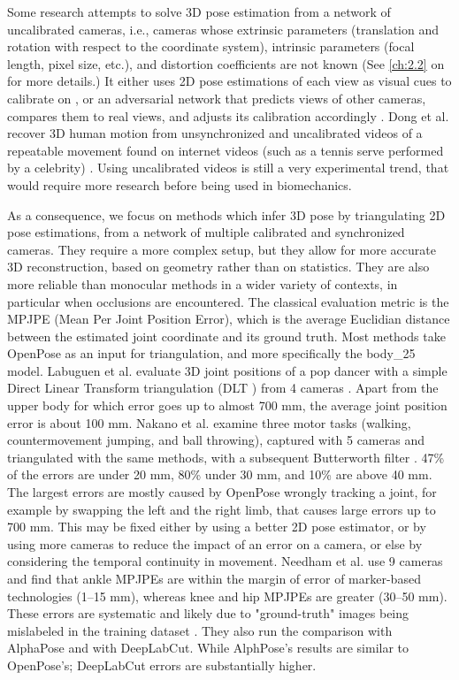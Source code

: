 \newpage
Some research attempts to solve 3D pose estimation from a network of uncalibrated cameras, i.e., cameras whose extrinsic parameters (translation and rotation with respect to the coordinate system), intrinsic parameters (focal length, pixel size, etc.), and distortion coefficients are not known (See \autoref{ch:2.2} on  for more details.) It either uses 2D pose estimations of each view as visual cues to calibrate on \cite{Takahashi2018, Xu2021, Liu2022a}, or an adversarial network that predicts views of other cameras, compares them to real views, and adjusts its calibration accordingly \cite{Ershadi-Nasab2021}. Dong et al. recover 3D human motion from unsynchronized and uncalibrated videos of a repeatable movement found on internet videos (such as a tennis serve performed by a celebrity) \cite{Dong2020}. Using uncalibrated videos is still a very experimental trend, that would require more research before being used in biomechanics. 

As a consequence, we focus on methods which infer 3D pose by triangulating 2D pose estimations, from a network of multiple calibrated and synchronized cameras. They require a more complex setup, but they allow for more accurate 3D reconstruction, based on geometry rather than on statistics. They are also more reliable than monocular methods in a wider variety of contexts, in particular when occlusions are encountered. The classical evaluation metric is the MPJPE (Mean Per Joint Position Error), which is the average Euclidian distance between the estimated joint coordinate and its ground truth. Most methods take OpenPose as an input for triangulation, and more specifically the body\_25 model. Labuguen et al. evaluate 3D joint positions of a pop dancer with a simple Direct Linear Transform triangulation (DLT \cite{Hartley1997,Miller1980}) from 4 cameras \cite{Labuguen2020}. Apart from the upper body for which error goes up to almost 700 mm, the average joint position error is about 100 mm. Nakano et al. examine three motor tasks (walking, countermovement jumping, and ball throwing), captured with 5 cameras and triangulated with the same methods, with a subsequent Butterworth filter \cite{Nakano2019}. 47\% of the errors are under 20 mm, 80\% under 30 mm, and 10\% are above 40 mm. The largest errors are mostly caused by OpenPose wrongly tracking a joint, for example by swapping the left and the right limb, that causes large errors up to 700 mm. This may be fixed either by using a better 2D pose estimator, or by using more cameras to reduce the impact of an error on a camera, or else by considering the temporal continuity in movement. Needham et al. use 9 cameras and find that ankle MPJPEs are within the margin of error of marker-based technologies (1–15 mm), whereas knee and hip MPJPEs are greater (30–50 mm). These errors are systematic and likely due to "ground-truth" images being mislabeled in the training dataset \cite{Needham2021b}. They also run the comparison with AlphaPose and with DeepLabCut. While AlphPose's results are similar to OpenPose’s; DeepLabCut errors are substantially higher.

